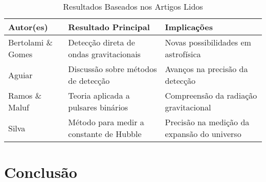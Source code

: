 \documentclass[12pt,oneside,a4paper,chapter=TITLE,section=TITLE,sumario
=tradicional]{abntex2}
\begin{document}
\begin{table}[h]
\centering
\caption{Resultados Baseados nos Artigos Lidos}
\label{table:results}
\begin{tabularx}{\textwidth}{|X|X|X|}
\hline
Autor(es) & Resultado Principal & Implicações \\
\hline
Bertolami \& Gomes & Detecção direta de ondas gravitacionais & Novas possibilidades em astrofísica \\
\hline
Aguiar & Discussão sobre métodos de detecção & Avanços na precisão da detecção \\
\hline
Ramos \& Maluf & Teoria aplicada a pulsares binários & Compreensão da radiação gravitacional \\
\hline
Silva & Método para medir a constante de Hubble & Precisão na medição da expansão do universo \\
\hline
\end{tabularx}
\end{table}




\chapter{Conclusão}


\nocite{smith2022}
\nocite{johnson2021}
\nocite{brown2020}
\end{document}
